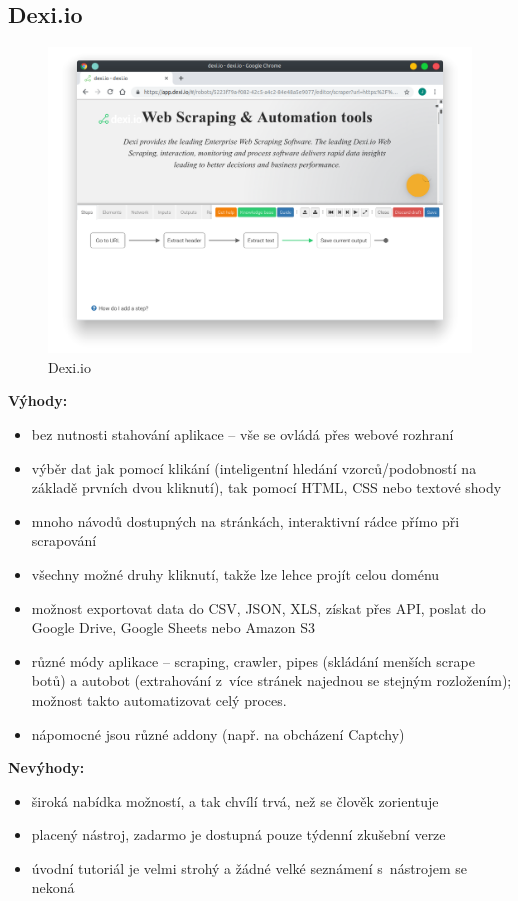 \documentclass[thesis=B,czech]{FITthesis}[2012/06/26]
\begin{document}
\subsection{Dexi.io}
\begin{figure}[h]
	\includegraphics[width=\linewidth]{images/Dexiio.png}
	\caption{Dexi.io}
	\label{fig:dexi.io}
\end{figure}
\textbf{Výhody:}
\begin{itemize}
	\item bez nutnosti stahování aplikace -- vše se ovládá přes webové rozhraní
	\item výběr dat jak pomocí klikání (inteligentní hledání vzorců/podobností na základě prvních dvou kliknutí), tak pomocí HTML, CSS nebo textové shody
	\item mnoho návodů dostupných na stránkách, interaktivní rádce přímo při scrapování
	\item všechny možné druhy kliknutí, takže lze lehce projít celou doménu
	\item možnost exportovat data do CSV, JSON, XLS, získat přes API, poslat do Google Drive, Google Sheets nebo Amazon S3
	\item různé módy aplikace -- scraping, crawler, pipes (skládání menších scrape botů) a autobot (extrahování z~více stránek najednou se stejným rozložením); možnost takto automatizovat celý proces.
	\item nápomocné jsou různé addony (např. na obcházení Captchy)
\end{itemize}
\textbf{Nevýhody:}
\begin{itemize}
	\item široká nabídka možností, a tak chvílí trvá, než se člověk zorientuje
	\item placený nástroj, zadarmo je dostupná pouze týdenní zkušební verze
	\item úvodní tutoriál je velmi strohý a žádné velké seznámení s~nástrojem se nekoná
\end{itemize}
\end{document}
